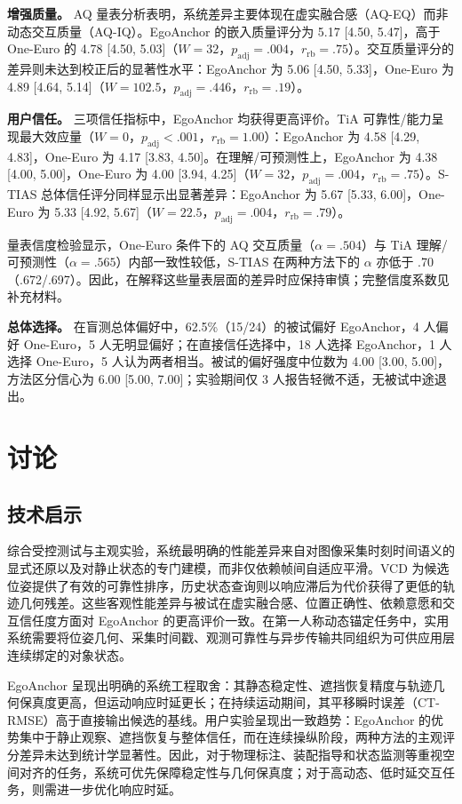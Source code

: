 \documentclass[review]{vgtc}
\begin{document}
\textbf{增强质量。}
AQ 量表分析表明，系统差异主要体现在虚实融合感（AQ-EQ）而非动态交互质量（AQ-IQ）。EgoAnchor 的嵌入质量评分为 5.17 [4.50, 5.47]，高于 One-Euro 的 4.78 [4.50, 5.03]（$W=32$，$p_{\mathrm{adj}}=.004$，$r_{\mathrm{rb}}=.75$）。交互质量评分的差异则未达到校正后的显著性水平：EgoAnchor 为 5.06 [4.50, 5.33]，One-Euro 为 4.89 [4.64, 5.14]（$W=102.5$，$p_{\mathrm{adj}}=.446$，$r_{\mathrm{rb}}=.19$）。

\textbf{用户信任。}
三项信任指标中，EgoAnchor 均获得更高评价。TiA 可靠性/能力呈现最大效应量（$W=0$，$p_{\mathrm{adj}}<.001$，$r_{\mathrm{rb}}=1.00$）：EgoAnchor 为 4.58 [4.29, 4.83]，One-Euro 为 4.17 [3.83, 4.50]。在理解/可预测性上，EgoAnchor 为 4.38 [4.00, 5.00]，One-Euro 为 4.00 [3.94, 4.25]（$W=32$，$p_{\mathrm{adj}}=.004$，$r_{\mathrm{rb}}=.75$）。S-TIAS 总体信任评分同样显示出显著差异：EgoAnchor 为 5.67 [5.33, 6.00]，One-Euro 为 5.33 [4.92, 5.67]（$W=22.5$，$p_{\mathrm{adj}}=.004$，$r_{\mathrm{rb}}=.79$）。

量表信度检验显示，One-Euro 条件下的 AQ 交互质量（$\alpha=.504$）与 TiA 理解/可预测性（$\alpha=.565$）内部一致性较低，S-TIAS 在两种方法下的 $\alpha$ 亦低于 .70（.672/.697）。因此，在解释这些量表层面的差异时应保持审慎；完整信度系数见补充材料。

\textbf{总体选择。}
在盲测总体偏好中，62.5\%（15/24）的被试偏好 EgoAnchor，4 人偏好 One-Euro，5 人无明显偏好；在直接信任选择中，18 人选择 EgoAnchor，1 人选择 One-Euro，5 人认为两者相当。被试的偏好强度中位数为 4.00 [3.00, 5.00]，方法区分信心为 6.00 [5.00, 7.00]；实验期间仅 3 人报告轻微不适，无被试中途退出。

\section{讨论}\label{sec:discussion}

\subsection{技术启示}

综合受控测试与主观实验，系统最明确的性能差异来自对图像采集时刻时间语义的显式还原以及对静止状态的专门建模，而非仅依赖帧间自适应平滑。VCD 为候选位姿提供了有效的可靠性排序，历史状态查询则以响应滞后为代价获得了更低的轨迹几何残差。这些客观性能差异与被试在虚实融合感、位置正确性、依赖意愿和交互信任度方面对 EgoAnchor 的更高评价一致。在第一人称动态锚定任务中，实用系统需要将位姿几何、采集时间戳、观测可靠性与异步传输共同组织为可供应用层连续绑定的对象状态。

EgoAnchor 呈现出明确的系统工程取舍：其静态稳定性、遮挡恢复精度与轨迹几何保真度更高，但运动响应时延更长；在持续运动期间，其平移瞬时误差（CT-RMSE）高于直接输出候选的基线。用户实验呈现出一致趋势：EgoAnchor 的优势集中于静止观察、遮挡恢复与整体信任，而在连续操纵阶段，两种方法的主观评分差异未达到统计学显著性。因此，对于物理标注、装配指导和状态监测等重视空间对齐的任务，系统可优先保障稳定性与几何保真度；对于高动态、低时延交互任务，则需进一步优化响应时延。
\end{document}
